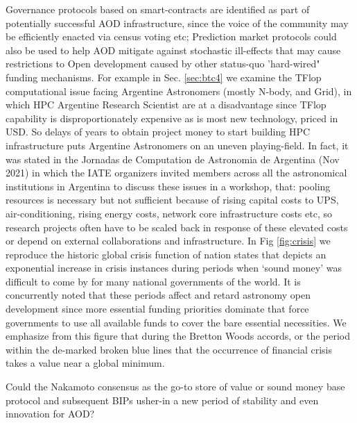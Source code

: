 \documentclass[final,5p,times,twocolumn,authoryear]{elsarticle}
\begin{document}
Governance protocols based on smart-contracts are identified as part of potentially successful AOD infrastructure, since the voice of the community may be efficiently enacted via census voting etc; Prediction market protocols could also be used to help AOD mitigate against stochastic ill-effects that may cause restrictions to Open development caused by other status-quo 'hard-wired" funding mechanisms. For example in Sec. \ref{sec:btc4} we examine the TFlop computational issue facing Argentine Astronomers (mostly N-body, and Grid), in which HPC Argentine Research Scientist are at a disadvantage since TFlop capability is disproportionately expensive as is most new technology, priced in USD. So delays of years to obtain project money to start building HPC infrastructure puts Argentine Astronomers on an uneven playing-field. In fact, it was stated in the Jornadas de Computation de Astronomia de Argentina (Nov 2021)  in which the IATE organizers invited members across all the astronomical institutions in Argentina to discuss these issues in a workshop, that: pooling resources is necessary but not sufficient because of rising capital costs to UPS, air-conditioning, rising energy costs, network core infrastructure costs etc, so research projects often have to be scaled back in response of these elevated costs or depend on external  collaborations and infrastructure. In Fig \ref{fig:crisis} we reproduce the historic global crisis function of nation states that depicts an exponential increase in crisis instances during periods when `sound money' was  difficult to come by for many national governments of the world. It is concurrently noted that these periods affect and retard astronomy open development since more essential funding priorities dominate that force governments to use all available funds to cover the bare essential necessities. We emphasize from this figure that during the Bretton Woods accords, or the period within the de-marked broken blue lines that the occurrence of financial crisis takes a value near a global minimum. 

Could the Nakamoto consensus as the go-to store of value or sound money base protocol and subsequent BIPs usher-in a new period of stability and even innovation for AOD? 
\end{document}
